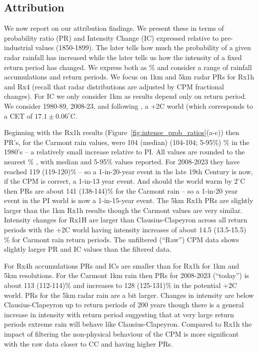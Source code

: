 \documentclass[11pt,a4paper]{article}
\begin{document}
\subsection{Attribution}
\label{subsect:attribution}
We now report on our attribution findings. We present these in terms of probability ratio (PR) and  Intensity Change (IC) expressed relative to pre-industrial values (1850-1899). The later tells how much the probability of a given radar rainfall has increased while the later tells us how the intensity of a fixed  return period has changed. We express both as \% and consider a range of rainfall accumulations and return periods. We focus on 1km and 5km radar PRs for Rx1h and Rx4 (recall that radar distributions are adjusted by CPM fractional changes).  For IC we only consider 1km as results depend only on return period.  We consider 1980-89, 2008-23, and following \cite{tett2023edinburgh}, a +2C world (which corresponds to a CET of $17.1 \pm 0.06 ^\circ$C.  

Beginning with the Rx1h results (Figure~\ref{fig:intense_prob_ratios}(a-c)) then PR's, for the Carmont rain values,  were 104 (median) (104-104; 5-95\%) \% in the 1980's -- a relatively small increase relative to PI. All values are rounded to the nearest \% , with median and 5-95\% values reported. For 2008-2023 they have reached  119 (119-120)\% -- so a 1-in-20-year event in the late 19th Century is now, if the CPM is correct, a 1-in-13 year event.  And should the world warm by $2^\circ$C then PRs are about 141 (138-144)\% for the Carmont rain -- so a 1-in-20 year event in the PI world is now a 1-in-15-year event. The 5km Rx1h PRs are slightly larger than the 1km Rx1h results though the Carmont values are very similar. Intensity changes for Rx1H are larger than Clausius-Clapeyron across all return periods with the +2C world having intensity increases of about 14.5 (13.5-15.5) \% for Carmont rain return periods. The unfiltered (``Raw'') CPM data  shows slightly larger PR and IC values than the filtered data.

For Rx4h accumulations PRs and ICs are smaller than for Rx1h for 1km and 5km resolutions. For the Carmont 1km  rain then PRs for 2008-2023 (``today'') is about  113 (112-114)\% and increases to 128 (125-131)\% in the potential +2C world. PRs for the 5km radar rain are a bit larger.  Changes in intensity are below Clausius-Clapeyron  up to return periods of 200 years though there is a general increase in intensity with return period suggesting that at very large return periods extreme rain will behave like   Clausius-Clapeyron. Compared to Rx1h the impact of filtering the non-physical behaviour of the CPM is more significant with the raw data closer to  CC  and having higher PRs. 
\end{document}
